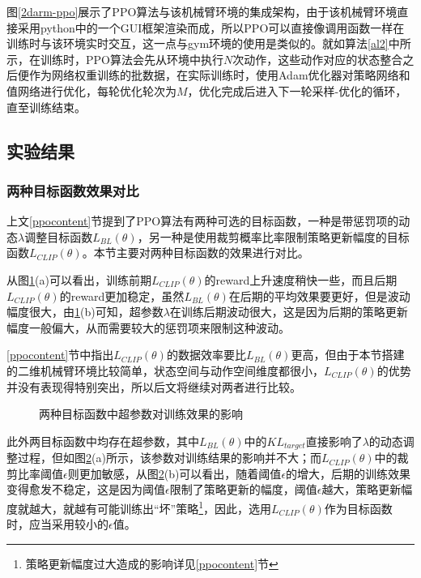 \documentclass[bachelor]{thesis-uestc}
\begin{document}
	图\ref{2darm-ppo}展示了PPO算法与该机械臂环境的集成架构，由于该机械臂环境直接采用python中的一个GUI框架渲染而成，所以PPO可以直接像调用函数一样在训练时与该环境实时交互，这一点与gym环境的使用是类似的。就如算法\ref{al2}中所示，在训练时，PPO算法会先从环境中执行$N$次动作，这些动作对应的状态整合之后便作为网络权重训练的批数据，在实际训练时，使用Adam优化器对策略网络和值网络进行优化，每轮优化轮次为$M$，优化完成后进入下一轮采样-优化的循环，直至训练结束。
	\subsection{实验结果}
	\subsubsection{两种目标函数效果对比}\label{sec:kl_vs_clip}
	上文\ref{ppocontent}节提到了PPO算法有两种可选的目标函数，一种是带惩罚项的动态$\lambda$调整目标函数$L_{BL}(\theta)$，另一种是使用裁剪概率比率限制策略更新幅度的目标函数$L_{CLIP}(\theta)$。本节主要对两种目标函数的效果进行对比。
	\begin{figure}[h]
		\centering
		\caption{}
		\label{kl-vs-clip}
	\end{figure}
	
	从图\ref{kl-vs-clip}(a)可以看出，训练前期$L_{CLIP}(\theta)$的reward上升速度稍快一些，而且后期$L_{CLIP}(\theta)$的reward更加稳定，虽然$L_{BL}(\theta)$在后期的平均效果要更好，但是波动幅度很大，由\ref{kl-vs-clip}(b)可知，超参数$\lambda$在训练后期波动很大，这是因为后期的策略更新幅度一般偏大，从而需要较大的惩罚项来限制这种波动。
	
	\ref{ppocontent}节中指出$L_{CLIP}(\theta)$的数据效率要比$L_{BL}(\theta)$更高，但由于本节搭建的二维机械臂环境比较简单，状态空间与动作空间维度都很小，$L_{CLIP}(\theta)$的优势并没有表现得特别突出，所以后文将继续对两者进行比较。
	
	\begin{figure}[h]
		\centering
		\caption{两种目标函数中超参数对训练效果的影响}
		\label{hyperparams}
	\end{figure}
	此外两目标函数中均存在超参数，其中$L_{BL}(\theta)$中的$KL_{target}$直接影响了$\lambda$的动态调整过程，但如图\ref{hyperparams}(a)所示，该参数对训练结果的影响并不大；而$L_{CLIP}(\theta)$中的裁剪比率阈值$\epsilon$则更加敏感，从图\ref{hyperparams}(b)可以看出，随着阈值$\epsilon$的增大，后期的训练效果变得愈发不稳定，这是因为阈值$\epsilon$限制了策略更新的幅度，阈值$\epsilon$越大，策略更新幅度就越大，就越有可能训练出“坏”策略\footnote{策略更新幅度过大造成的影响详见\ref{ppocontent}节}，因此，选用$L_{CLIP}(\theta)$作为目标函数时，应当采用较小的$\epsilon$值。
	
\end{document}
